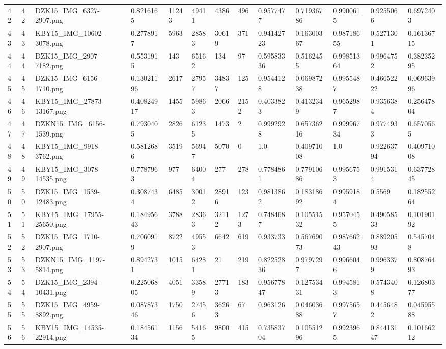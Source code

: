 \documentclass[11pt, a4paper, twoside]{report}
\begin{document}
\begin{longtable}[c]{@{}lllllllllllll@{}}
42 & 42 & DZK15\_IMG\_6327-2907.png & 0.8216165 & 11243 & 49411 & 4386 & 496 & 0.9577477 & 0.71936786 & 0.9900615 & 0.9255066 & 0.6972403 \\
43 & 43 & KBY15\_IMG\_10602-3078.png & 0.2778917 & 5963 & 28583 & 30619 & 371 & 0.94142723 & 0.16300367 & 0.98718655 & 0.5271301 & 0.16136715 \\
44 & 44 & DZK15\_IMG\_2907-7182.png & 0.5531915 & 143 & 65162 & 134 & 97 & 0.59583336 & 0.5162455 & 0.99851364 & 0.9964752 & 0.38235295 \\
45 & 45 & DZK15\_IMG\_6156-1710.png & 0.13021196 & 2617 & 27957 & 34837 & 125 & 0.9544128 & 0.06987238 & 0.9955487 & 0.46652222 & 0.06963996 \\
46 & 46 & KBY15\_IMG\_27873-13167.png & 0.40824917 & 1455 & 59863 & 2066 & 2152 & 0.4033823 & 0.4132349 & 0.9652987 & 0.9356384 & 0.25647804 \\
47 & 47 & DZKN15\_IMG\_6156-1539.png & 0.7930405 & 2826 & 61235 & 1473 & 2 & 0.9992928 & 0.65736216 & 0.99996734 & 0.9774933 & 0.6570565 \\
48 & 48 & KBY15\_IMG\_9918-3762.png & 0.5812686 & 3519 & 56947 & 5070 & 0 & 1.0 & 0.40971008 & 1.0 & 0.92263794 & 0.40971008 \\
49 & 49 & KBY15\_IMG\_3078-14535.png & 0.7787963 & 977 & 64004 & 277 & 278 & 0.7784861 & 0.77910686 & 0.9956753 & 0.9915314 & 0.63772845 \\
50 & 50 & DZK15\_IMG\_1539-12483.png & 0.3087434 & 6485 & 30012 & 28916 & 123 & 0.9813862 & 0.18318692 & 0.9959184 & 0.5569 & 0.18255264 \\
51 & 51 & KBY15\_IMG\_17955-25650.png & 0.18495643 & 3788 & 28363 & 32112 & 1273 & 0.7484687 & 0.10551532 & 0.9570455 & 0.49058533 & 0.10190192 \\
52 & 52 & DZK15\_IMG\_1710-2907.png & 0.7060919 & 8722 & 49553 & 6642 & 619 & 0.933733 & 0.56769073 & 0.98766243 & 0.88920593 & 0.5457048 \\
53 & 53 & DZKN15\_IMG\_1197-5814.png & 0.8942731 & 1015 & 64281 & 21 & 219 & 0.82252836 & 0.9797297 & 0.9966046 & 0.9963379 & 0.80876493 \\
54 & 54 & DZK15\_IMG\_2394-10431.png & 0.22506805 & 4051 & 33589 & 27713 & 183 & 0.95677847 & 0.12753431 & 0.9945813 & 0.5743408 & 0.12680377 \\
55 & 55 & DZK15\_IMG\_4959-8892.png & 0.08787346 & 1750 & 27456 & 36263 & 67 & 0.963126 & 0.04603688 & 0.9975657 & 0.4456482 & 0.04595588 \\
56 & 56 & KBY15\_IMG\_14535-22914.png & 0.18456134 & 1156 & 54165 & 9800 & 415 & 0.73583704 & 0.10551296 & 0.9923965 & 0.84413147 & 0.10166212 \\

\end{longtable}
\end{document}
